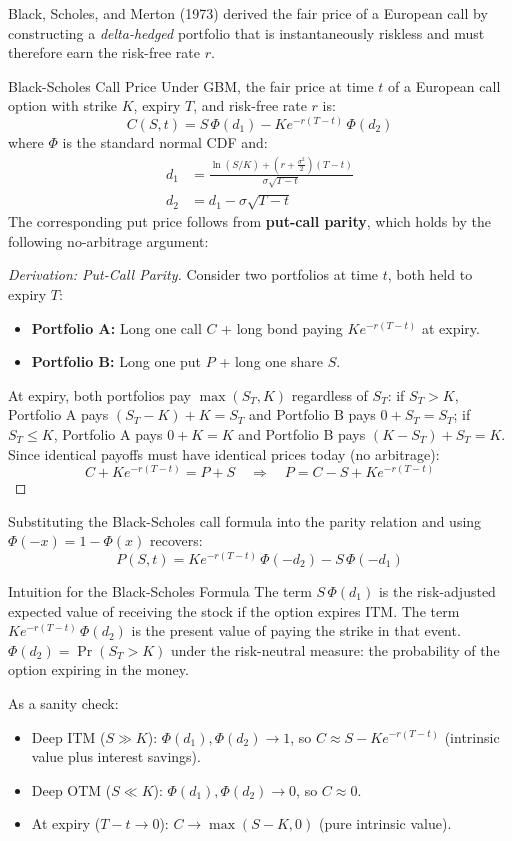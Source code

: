 \documentclass[12pt,a4paper,openany]{report}
\theoremstyle{definition}
\begin{document}
Black, Scholes, and Merton (1973) derived the fair price of a European call by constructing a \emph{delta-hedged} portfolio that is instantaneously riskless and must therefore earn the risk-free rate $r$.

\begin{definitionbox}{Black-Scholes Call Price}
Under GBM, the fair price at time $t$ of a European call option with strike $K$, expiry $T$, and risk-free rate $r$ is:
\[
  C(S, t) = S\,\Phi(d_1) - K e^{-r(T-t)}\,\Phi(d_2)
\]
where $\Phi$ is the standard normal CDF and:
\begin{align}
  d_1 &= \frac{\ln(S/K) + \left(r + \frac{\sigma^2}{2}\right)(T-t)}{\sigma\sqrt{T-t}} \\[4pt]
  d_2 &= d_1 - \sigma\sqrt{T-t}
\end{align}
The corresponding put price follows from \textbf{put-call parity}, which holds by the following no-arbitrage argument:

\begin{proof}[Derivation: Put-Call Parity]
Consider two portfolios at time $t$, both held to expiry $T$:
\begin{itemize}
  \item \textbf{Portfolio A:} Long one call $C$ + long bond paying $K e^{-r(T-t)}$ at expiry.
  \item \textbf{Portfolio B:} Long one put $P$ + long one share $S$.
\end{itemize}
At expiry, both portfolios pay $\max(S_T, K)$ regardless of $S_T$: if $S_T > K$, Portfolio A pays $(S_T - K) + K = S_T$ and Portfolio B pays $0 + S_T = S_T$; if $S_T \leq K$, Portfolio A pays $0 + K = K$ and Portfolio B pays $(K - S_T) + S_T = K$. Since identical payoffs must have identical prices today (no arbitrage):
\[
  C + K e^{-r(T-t)} = P + S \quad \Longrightarrow \quad P = C - S + K e^{-r(T-t)}
\]
\end{proof}

Substituting the Black-Scholes call formula into the parity relation and using $\Phi(-x) = 1 - \Phi(x)$ recovers:
\[
  P(S, t) = K e^{-r(T-t)}\,\Phi(-d_2) - S\,\Phi(-d_1)
\]
\end{definitionbox}

\begin{examplebox}{Intuition for the Black-Scholes Formula}
The term $S\,\Phi(d_1)$ is the risk-adjusted expected value of receiving the stock if the option expires ITM. The term $K e^{-r(T-t)}\,\Phi(d_2)$ is the present value of paying the strike in that event. $\Phi(d_2) = \Pr(S_T > K)$ under the risk-neutral measure: the probability of the option expiring in the money.

As a sanity check:
\begin{itemize}
  \item Deep ITM ($S \gg K$): $\Phi(d_1), \Phi(d_2) \to 1$, so $C \approx S - K e^{-r(T-t)}$ (intrinsic value plus interest savings).
  \item Deep OTM ($S \ll K$): $\Phi(d_1), \Phi(d_2) \to 0$, so $C \approx 0$.
  \item At expiry ($T - t \to 0$): $C \to \max(S - K, 0)$ (pure intrinsic value).
\end{itemize}
\end{examplebox}
\end{document}
